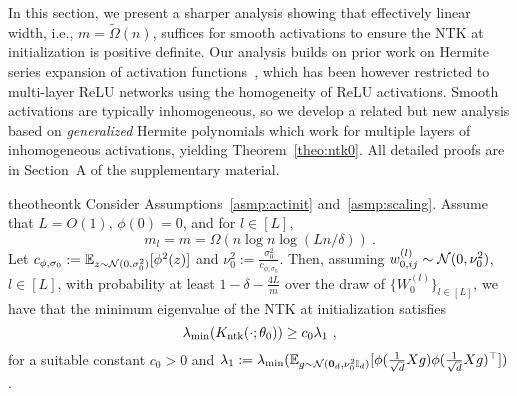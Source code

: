 
In this section, we present a sharper analysis showing that  effectively linear width, i.e., $m=\widetilde{\Omega}(n)$, suffices for smooth activations to ensure the NTK at initialization is positive definite. Our analysis builds on prior work on Hermite series expansion of activation functions~\citep{oymak2020hermite,ng2020hermite1,ng2021hermite2}, which has been however restricted to multi-layer ReLU networks using the homogeneity of ReLU activations. Smooth activations are typically inhomogeneous, so we develop a related but new analysis based on {\em generalized} Hermite polynomials which work for multiple layers of inhomogeneous activations, yielding Theorem~\ref{theo:ntk0}. All detailed proofs are in Section~A of the supplementary material. 

%
 
%
\begin{restatable}[\textbf{Linear width on the number of samples $m=\tilde{\Omega}(n)$ suffices for the NTK condition at initialization}]{theo}{theontk}
Consider Assumptions~\ref{asmp:actinit} and~\ref{asmp:scaling}. Assume that $L=O(1)$, $\phi(0)=0$, and for $l \in [L]$,
$$m_{l}  = m = \Omega( n \log n  \log (Ln/\delta))~.$$  
Let $c_{\phi,\sigma_0} := \mathbb{E}_{z \sim {\cal N}(0,\sigma_0^2)}[\phi^2(z)]$ and $\nu_0^2 := \frac{\sigma_0^2}{c_{\phi,\sigma_0}}$. Then, assuming $w^{(l)}_{0,ij}\sim {\cal N}(0,\nu_0^2)$, $l \in [L]$, with probability at least $1- \delta - \frac{4L}{m}$ over the draw of $\{W_0^{(l)}\}_{l\in[L]}$, we have that the minimum eigenvalue of the NTK at initialization satisfies
$$\lambda_{\min}( K_{\operatorname{ntk}}(\cdot ;\theta_0) ) \geq c_0 \lambda_1~,$$
for a suitable constant $c_0 > 0$ and $\lambda_1 := \lambda_{\min}(\mathbb{E}_{g \sim {\cal N}(\bm{0}_{d},\nu_0^2 \mathbb{I}_{d})
}[ \phi(\frac{1}{\sqrt{d}} X g) \phi(\frac{1}{\sqrt{d}} X g)^\top])$.
\label{theo:ntk0}
\end{restatable}

